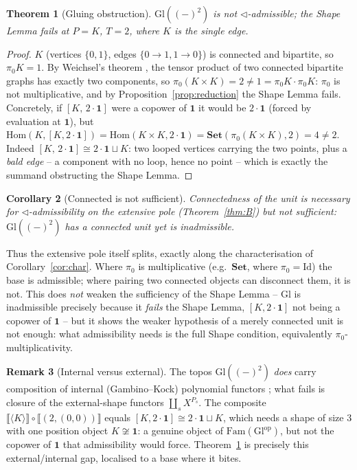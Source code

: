 \documentclass[11pt]{amsart}
\theoremstyle{plain}
\newtheorem{theorem}{Theorem}[section]
\newtheorem{corollary}[theorem]{Corollary}
\theoremstyle{definition}
\newtheorem{remark}[theorem]{Remark}
\newcommand{\Fam}{\mathrm{Fam}}
\newcommand{\ext}[1]{\llbracket #1 \rrbracket}
\newcommand{\Setb}{\mathbf{Set}}
\newcommand{\Gl}{\mathrm{Gl}}
\newcommand{\op}{\mathrm{op}}
\newcommand{\Hom}{\mathrm{Hom}}
\newcommand{\comp}{\mathbin{\triangleleft}}
\newcommand{\one}{\mathbf{1}}
\newcommand{\gena}[1]{\langle #1 \rangle}
\newcommand{\pizero}{\pi_0}
\begin{document}
\begin{theorem}[Gluing obstruction]\label{thm:G}
$\Gl((-)^2)$ is not $\comp$-admissible; the Shape Lemma fails at $P=K$, $T=2$, where $K$ is the single
edge.
\end{theorem}
\begin{proof}
$K$ (vertices $\{0,1\}$, edges $\{0\to1,1\to0\}$) is connected and bipartite, so $\pizero K=1$. By
Weichsel's theorem \cite{Weichsel}, the tensor product of two connected bipartite graphs has exactly
two components, so $\pizero(K\times K)=2\neq1=\pizero K\cdot\pizero K$: $\pizero$ is not
multiplicative, and by Proposition~\ref{prop:reduction} the Shape Lemma fails. Concretely, if
$[K,\,2\cdot\one]$ were a copower of $\one$ it would be $2\cdot\one$ (forced by evaluation at $\one$),
but $\Hom(K,[K,2\cdot\one])=\Hom(K\times K,2\cdot\one)=\Setb(\pizero(K\times K),2)=4\neq2$. Indeed
$[K,\,2\cdot\one]\cong 2\cdot\one\sqcup K$: two looped vertices carrying the two points, plus a
\emph{bald edge} -- a component with no loop, hence no point -- which is exactly the summand
obstructing the Shape Lemma.
\end{proof}

\begin{corollary}[Connected is not sufficient]\label{cor:connected-not-sufficient}
Connectedness of the unit is necessary for $\comp$-admissibility on the extensive pole
(Theorem~\ref{thm:B}) but not sufficient: $\Gl((-)^2)$ has a connected unit yet is inadmissible.
\end{corollary}

Thus the extensive pole itself splits, exactly along the characterisation of
Corollary~\ref{cor:char}. Where $\pizero$ is multiplicative (e.g.\ $\Setb$, where
$\pizero=\mathrm{Id}$) the base is admissible; where pairing two connected objects can disconnect
them, it is not. This does \emph{not} weaken the sufficiency of the Shape Lemma -- $\Gl$ is
inadmissible precisely because it \emph{fails} the Shape Lemma, $[K,2\cdot\one]$ not being a copower
of $\one$ -- but it shows the weaker hypothesis of a merely connected unit is not enough: what
admissibility needs is the full Shape condition, equivalently $\pizero$-multiplicativity.

\begin{remark}[Internal versus external]\label{rem:internal}
The topos $\Gl((-)^2)$ \emph{does} carry composition of internal (Gambino--Kock) polynomial functors
\cite{GambinoKock}; what fails is closure of the external-shape functors $\coprod_s X^{P_s}$. The
composite $\ext{\gena{K}}\circ\ext{(2,(0,0))}$ equals $[K,2\cdot\one]\cong 2\cdot\one\sqcup K$, which
needs a shape of size $3$ with one position object $K\not\cong\one$: a genuine object of
$\Fam(\Gl^{\op})$, but not the copower
of $\one$ that admissibility would force. Theorem~\ref{thm:G} is precisely this external/internal gap,
localised to a base where it bites.
\end{remark}
\end{document}
